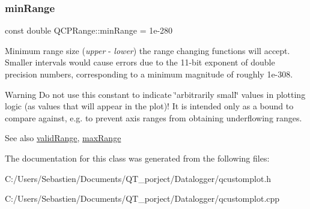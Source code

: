 \subsubsection{\texorpdfstring{min\+Range}{minRange}}
{\footnotesize\ttfamily const double Q\+C\+P\+Range\+::min\+Range = 1e-\/280\hspace{0.3cm}{\ttfamily [static]}}

Minimum range size ({\itshape upper} -\/ {\itshape lower}) the range changing functions will accept. Smaller intervals would cause errors due to the 11-\/bit exponent of double precision numbers, corresponding to a minimum magnitude of roughly 1e-\/308.

\begin{DoxyWarning}{Warning}
Do not use this constant to indicate \char`\"{}arbitrarily small\char`\"{} values in plotting logic (as values that will appear in the plot)! It is intended only as a bound to compare against, e.\+g. to prevent axis ranges from obtaining underflowing ranges.
\end{DoxyWarning}
\begin{DoxySeeAlso}{See also}
\hyperlink{class_q_c_p_range_ab38bd4841c77c7bb86c9eea0f142dcc0}{valid\+Range}, \hyperlink{class_q_c_p_range_a5ca51e7a2dc5dc0d49527ab171fe1f4f}{max\+Range} 
\end{DoxySeeAlso}


The documentation for this class was generated from the following files\+:\begin{DoxyCompactItemize}
\item 
C\+:/\+Users/\+Sebastien/\+Documents/\+Q\+T\+\_\+porject/\+Datalogger/qcustomplot.\+h\item 
C\+:/\+Users/\+Sebastien/\+Documents/\+Q\+T\+\_\+porject/\+Datalogger/qcustomplot.\+cpp\end{DoxyCompactItemize}
